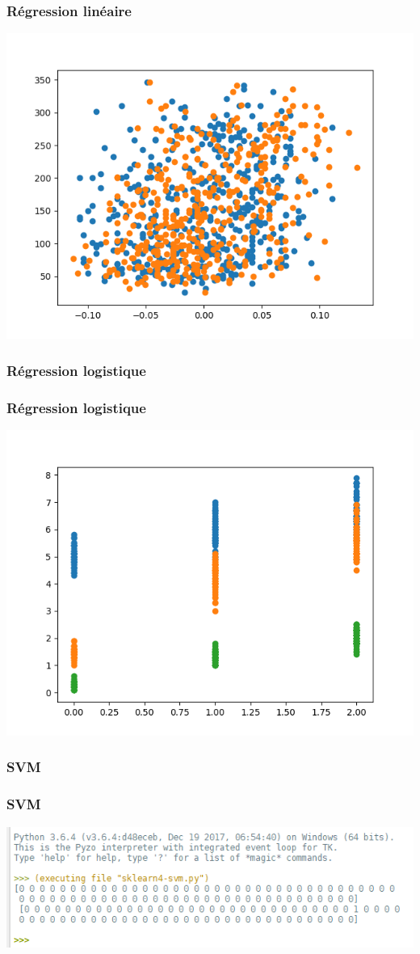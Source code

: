 \documentclass[11pt]{beamer}
\newenvironment{slide}[1]{%
\begin{frame}[environment=slide]
\frametitle{#1}
}{%
\end{frame}
}
\newcommand{\Python}[1]{
	{\small	}
}
\begin{document}
\begin{slide}{Régression linéaire}

\includegraphics[scale=0.5]{diabete}

\end{slide}

\begin{slide}{Régression logistique}

\Python{sklearn3-reglog}

\end{slide}

\begin{slide}{Régression logistique}

\includegraphics[scale=0.5]{logiris}

\end{slide}

\begin{slide}{SVM}

\Python{sklearn4-svm}

\end{slide}

\begin{slide}{SVM}

\includegraphics[scale=0.5]{sksvm}

\end{slide}
\end{document}
